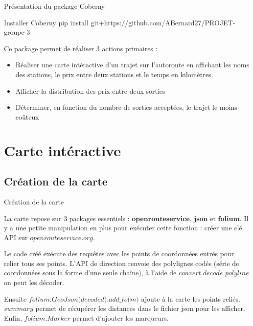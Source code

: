 \documentclass{beamer}
\begin{document}
\begin{frame}[fragile]{Présentation du package Coberny}
\begin{block}{Installer Coberny}
pip install git+https://github.com/ABernard27/PROJET-groupe-3
\end{block}
Ce package permet de réaliser 3 actions primaires : \newline
\begin{itemize}
\item Réaliser une carte intéractive d'un trajet sur l'autoroute en affichant les noms des stations, le prix entre deux stations et le temps en kilomètres.
\item Afficher la distribution des prix entre deux sorties
\item Déterminer, en fonction du nombre de sorties acceptées, le trajet le moins coûteux
\end{itemize}
\end{frame}



\section{Carte intéractive}
\subsection{Création de la carte}

\begin{frame}[fragile]{Création de la carte}

La carte repose sur 3 packages essentiels : $\textbf{openrouteservice}$, $\textbf{json}$ et $\textbf{folium}$. Il y a une petite manipulation en plus pour exécuter cette fonction : créer une clé API sur $\textit{openrouteservice.org}$. \newline
\pause

Le code créé exécute des requêtes avec les points de coordonnées entrés pour relier tous ses points. L'API de direction renvoie des polylignes codés (série de coordonnées sous la forme d'une seule chaîne), à l'aide de
$\textit{convert.decode\_polyline}$ on peut les décoder. \newline
\pause

Ensuite $\textit{folium.GeoJson(decoded).add\_to(m)}$ ajoute à la carte les points reliés. $\textit{summary}$ permet de récupérer les distances dans le fichier json pour les afficher. Enfin, $\textit{folium.Marker}$ permet d'ajouter les marqueurs.
\end{frame}
\end{document}
